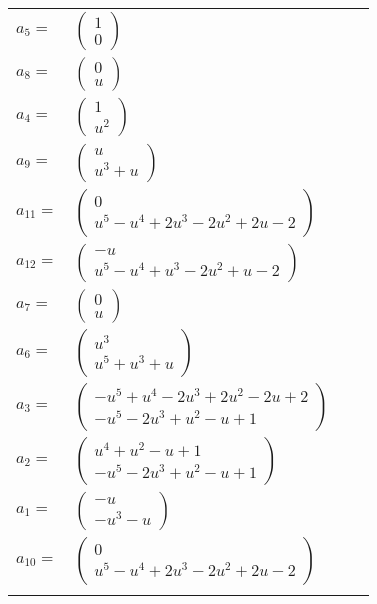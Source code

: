\documentclass[1p]{elsarticle_modified}
\theoremstyle{definition}
\begin{document}
\begin{tabular}{m{7pt} m{180pt} m{7pt} m{180pt} }
\flushright $a_{5}=$&$\begin{pmatrix}1\\0\end{pmatrix}$ \\
\flushright $a_{8}=$&$\begin{pmatrix}0\\u\end{pmatrix}$ \\
\flushright $a_{4}=$&$\begin{pmatrix}1\\u^2\end{pmatrix}$ \\
\flushright $a_{9}=$&$\begin{pmatrix}u\\u^3+u\end{pmatrix}$ \\
\flushright $a_{11}=$&$\begin{pmatrix}0\\u^5- u^4+2 u^3-2 u^2+2 u-2\end{pmatrix}$ \\
\flushright $a_{12}=$&$\begin{pmatrix}- u\\u^5- u^4+u^3-2 u^2+u-2\end{pmatrix}$ \\
\flushright $a_{7}=$&$\begin{pmatrix}0\\u\end{pmatrix}$ \\
\flushright $a_{6}=$&$\begin{pmatrix}u^3\\u^5+u^3+u\end{pmatrix}$ \\
\flushright $a_{3}=$&$\begin{pmatrix}- u^5+u^4-2 u^3+2 u^2-2 u+2\\- u^5-2 u^3+u^2- u+1\end{pmatrix}$ \\
\flushright $a_{2}=$&$\begin{pmatrix}u^4+u^2- u+1\\- u^5-2 u^3+u^2- u+1\end{pmatrix}$ \\
\flushright $a_{1}=$&$\begin{pmatrix}- u\\- u^3- u\end{pmatrix}$ \\
\flushright $a_{10}=$&$\begin{pmatrix}0\\u^5- u^4+2 u^3-2 u^2+2 u-2\end{pmatrix}$\\&\end{tabular}
\end{document}
